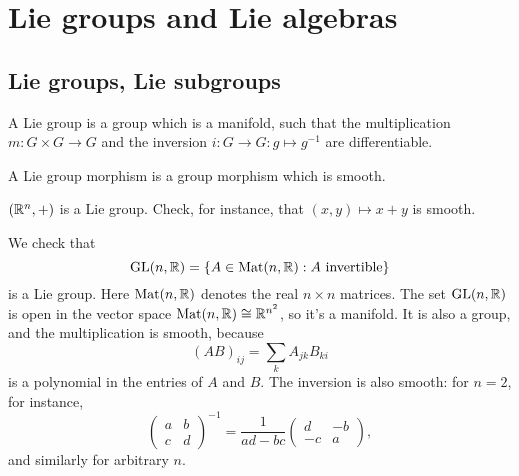 \setcounter{chapter}{8}
\chapter{Lie groups and Lie algebras}
\section{Lie groups, Lie subgroups}
\begin{definition}
    A Lie group is a group which is a manifold, such that the multiplication 
    $m: G \times G \to  G$  and the inversion \mbox{$i: G \to  G: g \mapsto g^{-1}$} are differentiable.
\end{definition}

\begin{definition}
    A Lie group morphism is a group morphism which is smooth.
\end{definition}
\begin{eg}
    $(\mathbb{R}^n, +)$ is a Lie group. Check, for instance, that $(x, y) \mapsto  x + y$ is smooth.
\end{eg}
\begin{eg}  We check that
    $$\operatorname{GL}(n, \mathbb{R}) = \{A \in \text{Mat}(n, \mathbb{R}): A \text{ invertible}\}$$ is a Lie group. Here $\text{Mat}(n, \mathbb{R})$ denotes the real $n \times n$ matrices.
    The set $\operatorname{GL}(n, \mathbb{R})$ is open in the vector space $\operatorname{Mat}(n, \mathbb{R})\cong \mathbb{R}^{n^2}$, so it's a manifold.
    It is also a group, 
    and the multiplication is smooth, because
    \[
        (AB)_{ij} = \sum_k A_{jk} B_{ki}
   \] 
   is a polynomial in the entries of $A$ and $B$.
    The inversion is also smooth: for $n=2$, for instance,
    \[
    \begin{pmatrix}
    	a & b \\
    	c & d 
    \end{pmatrix}^{-1}
    =
    \frac{1}{ad - bc}
    \begin{pmatrix}
    	d & -b \\
    	-c & a 
    \end{pmatrix}
    ,\] 
 and similarly for arbitrary $n$.
    \end{eg}
    
